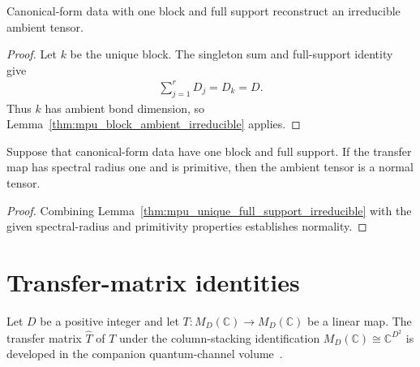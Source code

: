 \begin{lemma}
    \label{thm:mpu_unique_full_support_irreducible}
    \leanok
    Canonical-form data with one block and full support reconstruct
    an irreducible ambient tensor.
\end{lemma}

\begin{proof}\leanok
    Let $k$ be the unique block.  The singleton sum and full-support
    identity give
    \begin{align}
        \sum_{j=1}^{r} D_j = D_k = D.
    \end{align}
    Thus $k$ has ambient bond dimension, so
    Lemma~\ref{thm:mpu_block_ambient_irreducible} applies.
\end{proof}

\begin{lemma}
    \label{thm:mpu_unique_full_support_normal}
    \leanok
    Suppose that canonical-form data have one block and full
    support.  If the transfer map has spectral radius one and is primitive,
    then the ambient tensor is a normal tensor.
\end{lemma}

\begin{proof}\leanok
    Combining Lemma~\ref{thm:mpu_unique_full_support_irreducible} with the
    given spectral-radius and primitivity properties establishes normality.
\end{proof}

\section{Transfer-matrix identities}

Let $D$ be a positive integer and let
$T:M_D(\mathbb C)\to M_D(\mathbb C)$ be a linear map. The transfer matrix
$\widehat T$ of $T$ under the column-stacking identification
$M_D(\mathbb C)\cong\mathbb C^{D^2}$ is developed in the companion
quantum-channel volume~\cite[``Transfer matrix of a matrix endomorphism'',
    ``Transfer matrix in one family'', ``Functoriality of transfer matrices'',
    ``Trace preservation fixes the vectorized identity on the left'',
    ``Powers and traces of transfer matrices'']{QICLean2026Blueprint}.

